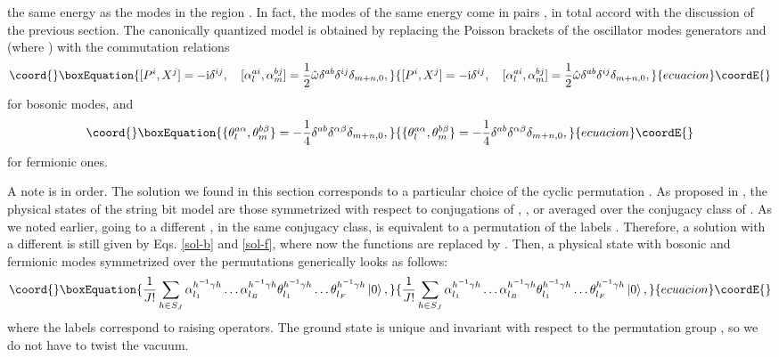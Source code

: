\documentclass[a4paper]{article}
\providecommand{\ii}{\mathrm{i}}
\providecommand{\ket}[1]{\left|#1\right\rangle}
\begin{document}
the same energy as the modes in the region \coordHE{}. In fact, the
modes of the same energy come in pairs \coordHE{}, in total
accord with the discussion of the previous section.
The canonically quantized model is obtained by replacing the
Poisson brackets of the oscillator modes generators \coordHE{}
and \coordHE{} (where \coordHE{}) with the commutation relations
\cite{Metsaev:2001bj,Metsaev:2002re}
\begin{equation}\coord{}\boxEquation{\label{quant-b}
  [P^i,X^j]=-\ii\delta^{ij},\quad [\alpha^{ai}_l,\alpha^{bj}_m]=
  \frac{1}{2}\hat{\omega}\delta^{ab}\delta^{ij}\delta_{m+n,0},
}{[P^i,X^j]=-\ii\delta^{ij},\quad [\alpha^{ai}_l,\alpha^{bj}_m]=
  \frac{1}{2}\hat{\omega}\delta^{ab}\delta^{ij}\delta_{m+n,0},
}{ecuacion}\coordE{}\end{equation}
for bosonic modes, and
\begin{equation}\coord{}\boxEquation{
  \{\theta^{a\alpha}_l,\theta^{b\beta}_m\}=
  -\frac{1}{4}\delta^{ab}\delta^{\alpha\beta}\delta_{m+n,0},
}{
  \{\theta^{a\alpha}_l,\theta^{b\beta}_m\}=
  -\frac{1}{4}\delta^{ab}\delta^{\alpha\beta}\delta_{m+n,0},
}{ecuacion}\coordE{}\end{equation}
for fermionic ones.

A note is in order. The solution we found in this section
corresponds to a particular choice of the cyclic permutation
\coordHE{}. As proposed in \cite{Verlinde:2002ig}, the physical
states of the string bit model are those symmetrized with respect
to conjugations of \myHighlight{$\gamma$}\coordHE{}, \coordHE{}, or averaged over
the conjugacy class of \myHighlight{$\gamma$}\coordHE{}. As we noted earlier, going to a
different \myHighlight{$\gamma$}\coordHE{}, in the same conjugacy class, is equivalent to
a permutation of the labels \coordHE{} \cite{Scott:GT}.
Therefore, a solution with a different \coordHE{} is
still given by Eqs. \eqref{sol-b} and \eqref{sol-f}, where now the
functions \coordHE{} are replaced by \coordHE{}.
Then, a physical state with \coordHE{} bosonic and \coordHE{} fermionic modes
symmetrized over the permutations generically looks as follows:
\begin{equation}\coord{}\boxEquation{
  \frac{1}{J!}\sum_{h\in S_J}\alpha^{h^{-1}\gamma h}_{l_1}\dots
  \alpha^{h^{-1}\gamma h}_{l_B}\theta^{h^{-1}\gamma h}_{l_1}\dots
  \theta^{h^{-1}\gamma h}_{l_F}\ket{0},
}{
  \frac{1}{J!}\sum_{h\in S_J}\alpha^{h^{-1}\gamma h}_{l_1}\dots
  \alpha^{h^{-1}\gamma h}_{l_B}\theta^{h^{-1}\gamma h}_{l_1}\dots
  \theta^{h^{-1}\gamma h}_{l_F}\ket{0},
}{ecuacion}\coordE{}\end{equation}
where the labels correspond to raising operators.
The ground state is unique and invariant with respect to the
permutation group \coordHE{}, so we do not have to twist the vacuum.
\end{document}
